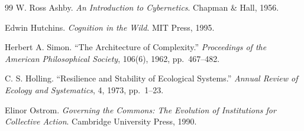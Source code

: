 \documentclass[11pt,a4paper]{article}
\theoremstyle{plain}
\theoremstyle{definition}
\theoremstyle{remark}
\begin{document}
\begin{thebibliography}{99}
W. Ross Ashby.
\textit{An Introduction to Cybernetics}.
Chapman \& Hall, 1956.

Edwin Hutchins.
\textit{Cognition in the Wild}.
MIT Press, 1995.

Herbert A. Simon.
``The Architecture of Complexity.''
\textit{Proceedings of the American Philosophical Society}, 106(6), 1962, pp.\ 467--482.

C. S. Holling.
``Resilience and Stability of Ecological Systems.''
\textit{Annual Review of Ecology and Systematics}, 4, 1973, pp.\ 1--23.

Elinor Ostrom.
\textit{Governing the Commons: The Evolution of Institutions for Collective Action}.
Cambridge University Press, 1990.

\end{thebibliography}
\end{document}
